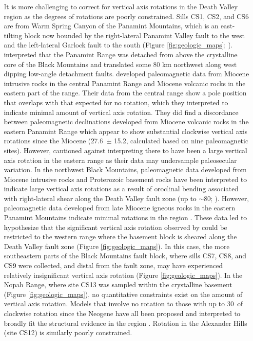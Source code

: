 It is more challenging to correct for vertical axis rotations in the Death Valley region as the degrees of rotations are poorly constrained. Sills CS1, CS2, and CS6 are from Warm Spring Canyon of the Panamint Mountains, which is an east-tilting block now bounded by the right-lateral Panamint Valley fault to the west and the left-lateral Garlock fault to the south (Figure \ref{fig:geologic_maps}; \citealp{Snow1989a, Snow2000a}). \cite{Stewart1983a} interpreted that the Panamint Range was detached from above the crystalline core of the Black Mountains and translated some 80 km northwest along west dipping low-angle detachment faults. \cite{Petronis2002a} developed paleomagnetic data from Miocene intrusive rocks in the central Panamint Range and Miocene volcanic rocks in the eastern part of the range. Their data from the central range show a pole position that overlaps with that expected for no rotation, which they interpreted to indicate minimal amount of vertical axis rotation. They did find a discordance between paleomagnetic declinations developed from Miocene volcanic rocks in the eastern Panamint Range which appear to show substantial clockwise vertical axis rotations since the Miocene (27.6\textdegree\ $\pm$ 15.2\textdegree, calculated based on nine paleomagnetic sites). However, \cite{Petronis2002a} cautioned against interpreting there to have been a large vertical axis rotation in the eastern range as their data may undersample paleosecular variation. In the northwest Black Mountains, paleomagnetic data developed from Miocene intrusive rocks and Proterozoic basement rocks have been interpreted to indicate large vertical axis rotations as a result of oroclinal bending associated with right-lateral shear along the Death Valley fault zone (up to $\sim$80\textdegree; \citealp{Holm1993a}). However, paleomagnetic data developed from late Miocene igneous rocks in the eastern Panamint Mountains indicate minimal rotations in the region \citep{Petronis2002a}. These data led \cite{Petronis2002a} to hypothesize that the significant vertical axis rotation observed by \cite{Holm1993a} could be restricted to the western range where the basement block is sheared along the Death Valley fault zone (Figure \ref{fig:geologic_maps}). In this case, the more southeastern parts of the Black Mountains fault block, where sills CS7, CS8, and CS9 were collected, and distal from the fault zone, may have experienced relatively insignificant vertical axis rotation (Figure \ref{fig:geologic_maps}). In the Nopah Range, where site CS13 was sampled within the crystalline basement (Figure \ref{fig:geologic_maps}), no quantitative constraints exist on the amount of vertical axis rotation. Models that involve no rotation to those with up to 30\textdegree\ of clockwise rotation since the Neogene have all been proposed and interpreted to broadly fit the structural evidence in the region \cite[e.g.][]{Serpa1996a, Pavlis2014a}. Rotation in the Alexander Hills (site CS12) is similarly poorly constrained. 

